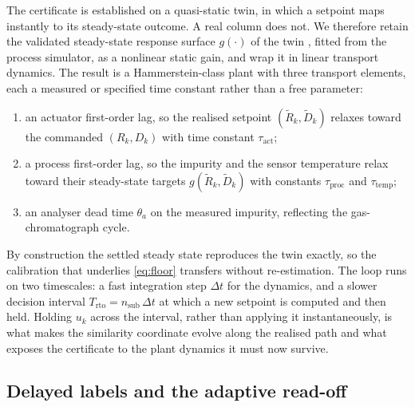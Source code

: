 \documentclass[review,12pt]{elsarticle}
\begin{document}
The certificate is established on a quasi-static twin, in which a setpoint maps instantly to
its steady-state outcome. A real column does not. We therefore retain the validated
steady-state response surface $g(\cdot)$ of the twin \citep{busico_m3}, fitted from the
process simulator, as a nonlinear static gain, and wrap it in linear transport dynamics. The
result is a Hammerstein-class plant with three transport elements, each a measured or
specified time constant rather than a free parameter:
\begin{enumerate}
\item an actuator first-order lag, so the realised setpoint $(\tilde R_k,\tilde D_k)$ relaxes
  toward the commanded $(R_k,D_k)$ with time constant $\tau_{\mathrm{act}}$;
\item a process first-order lag, so the impurity and the sensor temperature relax toward their
  steady-state targets $g(\tilde R_k,\tilde D_k)$ with constants $\tau_{\mathrm{proc}}$ and
  $\tau_{\mathrm{temp}}$;
\item an analyser dead time $\theta_a$ on the measured impurity, reflecting the
  gas-chromatograph cycle.
\end{enumerate}
By construction the settled steady state reproduces the twin exactly, so the calibration that
underlies \eqref{eq:floor} transfers without re-estimation. The loop runs on two timescales: a
fast integration step $\Delta t$ for the dynamics, and a slower decision interval
$T_{\mathrm{rto}}=n_{\mathrm{sub}}\,\Delta t$ at which a new setpoint is computed and then held.
Holding $u_k$ across the interval, rather than applying it instantaneously, is what makes the
similarity coordinate evolve along the realised path and what exposes the certificate to the
plant dynamics it must now survive.

\subsection{Delayed labels and the adaptive read-off}
\label{sec:adaptive}
\end{document}
